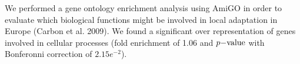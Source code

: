  We performed a gene ontology enrichment analysis using AmiGO in order to evaluate which biological functions might be involved in local adaptation in Europe (Carbon et al. 2009). 
 We found a significant over representation of genes involved in cellular processes (fold enrichment of 1.06 and $p{\rm -value}$ with Bonferonni correction of $2.15e^{-2}$).


% 
% 
% 
% 
% 
% 
% 
% 
% 



